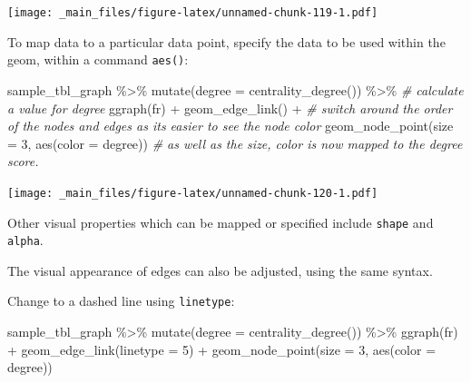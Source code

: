 \documentclass[
]{book}
\newenvironment{Shaded}{\begin{snugshade}}{\end{snugshade}}
\newcommand{\AttributeTok}[1]{\textcolor[rgb]{0.77,0.63,0.00}{#1}}
\newcommand{\CommentTok}[1]{\textcolor[rgb]{0.56,0.35,0.01}{\textit{#1}}}
\newcommand{\DecValTok}[1]{\textcolor[rgb]{0.00,0.00,0.81}{#1}}
\newcommand{\FunctionTok}[1]{\textcolor[rgb]{0.00,0.00,0.00}{#1}}
\newcommand{\NormalTok}[1]{#1}
\newcommand{\SpecialCharTok}[1]{\textcolor[rgb]{0.00,0.00,0.00}{#1}}
\newcommand{\StringTok}[1]{\textcolor[rgb]{0.31,0.60,0.02}{#1}}
\begin{document}
\texttt{[image: \_main\_files/figure-latex/unnamed-chunk-119-1.pdf]}

To map data to a particular data point, specify the data to be used within the geom, within a command \texttt{aes()}:

\begin{Shaded}
\begin{Highlighting}[]
\NormalTok{sample\_tbl\_graph }\SpecialCharTok{\%\textgreater{}\%} 
  \FunctionTok{mutate}\NormalTok{(}\AttributeTok{degree =} \FunctionTok{centrality\_degree}\NormalTok{()) }\SpecialCharTok{\%\textgreater{}\%} \CommentTok{\# calculate a value for degree}
  \FunctionTok{ggraph}\NormalTok{(}\StringTok{\textquotesingle{}fr\textquotesingle{}}\NormalTok{) }\SpecialCharTok{+} 
  \FunctionTok{geom\_edge\_link}\NormalTok{() }\SpecialCharTok{+} \CommentTok{\# switch around the order of the nodes and edges as it\textquotesingle{}s easier to see the node color}
  \FunctionTok{geom\_node\_point}\NormalTok{(}\AttributeTok{size =} \DecValTok{3}\NormalTok{, }\FunctionTok{aes}\NormalTok{(}\AttributeTok{color =}\NormalTok{ degree)) }\CommentTok{\# as well as the size, color is now mapped to the degree score.}
\end{Highlighting}
\end{Shaded}

\texttt{[image: \_main\_files/figure-latex/unnamed-chunk-120-1.pdf]}

Other visual properties which can be mapped or specified include \texttt{shape} and \texttt{alpha}.

The visual appearance of edges can also be adjusted, using the same syntax.

Change to a dashed line using \texttt{linetype}:

\begin{Shaded}
\begin{Highlighting}[]
\NormalTok{sample\_tbl\_graph }\SpecialCharTok{\%\textgreater{}\%} 
  \FunctionTok{mutate}\NormalTok{(}\AttributeTok{degree =} \FunctionTok{centrality\_degree}\NormalTok{()) }\SpecialCharTok{\%\textgreater{}\%} 
  \FunctionTok{ggraph}\NormalTok{(}\StringTok{\textquotesingle{}fr\textquotesingle{}}\NormalTok{) }\SpecialCharTok{+} 
  \FunctionTok{geom\_edge\_link}\NormalTok{(}\AttributeTok{linetype =} \DecValTok{5}\NormalTok{) }\SpecialCharTok{+} 
  \FunctionTok{geom\_node\_point}\NormalTok{(}\AttributeTok{size =} \DecValTok{3}\NormalTok{, }\FunctionTok{aes}\NormalTok{(}\AttributeTok{color =}\NormalTok{ degree))}
\end{Highlighting}
\end{Shaded}
\end{document}
